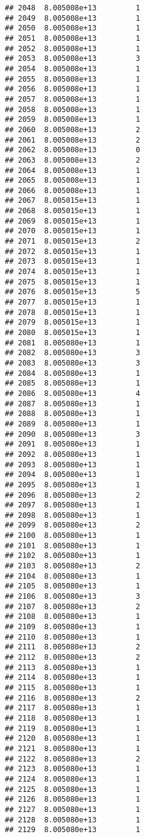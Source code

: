 \documentclass[
]{article}
\begin{document}
\begin{verbatim}
## 2048  8.005008e+13         1
## 2049  8.005008e+13         1
## 2050  8.005008e+13         1
## 2051  8.005008e+13         1
## 2052  8.005008e+13         1
## 2053  8.005008e+13         3
## 2054  8.005008e+13         1
## 2055  8.005008e+13         1
## 2056  8.005008e+13         1
## 2057  8.005008e+13         1
## 2058  8.005008e+13         1
## 2059  8.005008e+13         1
## 2060  8.005008e+13         2
## 2061  8.005008e+13         2
## 2062  8.005008e+13         0
## 2063  8.005008e+13         2
## 2064  8.005008e+13         1
## 2065  8.005008e+13         1
## 2066  8.005008e+13         1
## 2067  8.005015e+13         1
## 2068  8.005015e+13         1
## 2069  8.005015e+13         1
## 2070  8.005015e+13         1
## 2071  8.005015e+13         2
## 2072  8.005015e+13         1
## 2073  8.005015e+13         1
## 2074  8.005015e+13         1
## 2075  8.005015e+13         1
## 2076  8.005015e+13         5
## 2077  8.005015e+13         1
## 2078  8.005015e+13         1
## 2079  8.005015e+13         1
## 2080  8.005015e+13         1
## 2081  8.005080e+13         1
## 2082  8.005080e+13         3
## 2083  8.005080e+13         3
## 2084  8.005080e+13         1
## 2085  8.005080e+13         1
## 2086  8.005080e+13         4
## 2087  8.005080e+13         1
## 2088  8.005080e+13         1
## 2089  8.005080e+13         1
## 2090  8.005080e+13         3
## 2091  8.005080e+13         1
## 2092  8.005080e+13         1
## 2093  8.005080e+13         1
## 2094  8.005080e+13         1
## 2095  8.005080e+13         1
## 2096  8.005080e+13         2
## 2097  8.005080e+13         1
## 2098  8.005080e+13         1
## 2099  8.005080e+13         2
## 2100  8.005080e+13         1
## 2101  8.005080e+13         1
## 2102  8.005080e+13         1
## 2103  8.005080e+13         2
## 2104  8.005080e+13         1
## 2105  8.005080e+13         1
## 2106  8.005080e+13         3
## 2107  8.005080e+13         2
## 2108  8.005080e+13         1
## 2109  8.005080e+13         1
## 2110  8.005080e+13         1
## 2111  8.005080e+13         2
## 2112  8.005080e+13         2
## 2113  8.005080e+13         1
## 2114  8.005080e+13         1
## 2115  8.005080e+13         1
## 2116  8.005080e+13         2
## 2117  8.005080e+13         1
## 2118  8.005080e+13         1
## 2119  8.005080e+13         1
## 2120  8.005080e+13         1
## 2121  8.005080e+13         1
## 2122  8.005080e+13         2
## 2123  8.005080e+13         1
## 2124  8.005080e+13         1
## 2125  8.005080e+13         1
## 2126  8.005080e+13         1
## 2127  8.005080e+13         1
## 2128  8.005080e+13         1
## 2129  8.005080e+13         1

\end{verbatim}
\end{document}
